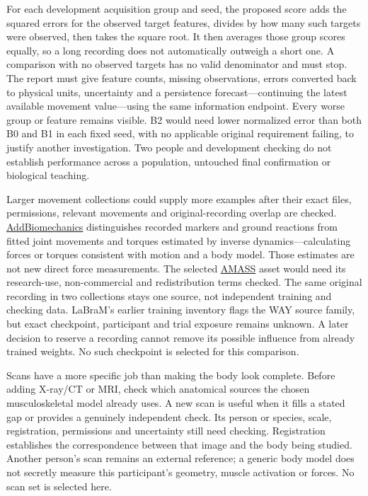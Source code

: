 For each development acquisition group and seed, the proposed score adds the squared errors for the observed target features, divides by how many such targets were observed, then takes the square root. It then averages those group scores equally, so a long recording does not automatically outweigh a short one. A comparison with no observed targets has no valid denominator and must stop. The report must give feature counts, missing observations, errors converted back to physical units, uncertainty and a persistence forecast---continuing the latest available movement value---using the same information endpoint. Every worse group or feature remains visible. B2 would need lower normalized error than both B0 and B1 in each fixed seed, with no applicable original requirement failing, to justify another investigation. Two people and development checking do not establish performance across a population, untouched final confirmation or biological teaching.

Larger movement collections could supply more examples after their exact files, permissions, relevant movements and original-recording overlap are checked. \href{https://www.addbiomechanics.org/download_data.html}{AddBiomechanics} distinguishes recorded markers and ground reactions from fitted joint movements and torques estimated by inverse dynamics---calculating forces or torques consistent with motion and a body model. Those estimates are not new direct force measurements. The selected \href{https://amass.is.tue.mpg.de/license.html}{AMASS} asset would need its research-use, non-commercial and redistribution terms checked. The same original recording in two collections stays one source, not independent training and checking data. LaBraM's earlier training inventory flags the WAY source family, but exact checkpoint, participant and trial exposure remains unknown. A later decision to reserve a recording cannot remove its possible influence from already trained weights. No such checkpoint is selected for this comparison.

Scans have a more specific job than making the body look complete. Before adding X-ray/CT or MRI, check which anatomical sources the chosen musculoskeletal model already uses. A new scan is useful when it fills a stated gap or provides a genuinely independent check. Its person or species, scale, registration, permissions and uncertainty still need checking. Registration establishes the correspondence between that image and the body being studied. Another person's scan remains an external reference; a generic body model does not secretly measure this participant's geometry, muscle activation or forces. No scan set is selected here.

